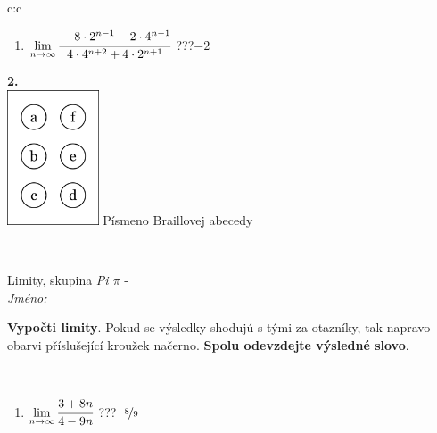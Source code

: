 \documentclass[10pt]{report}
\begin{document}
\begin{tabular}{c:c}
\begin{minipage}[c][104.5mm][t]{0.5\linewidth}
\begin{center}
\begin{minipage}{0.79\linewidth}
\begin{center}
\begin{varwidth}{\linewidth}
\begin{enumerate}
\item $\lim\limits_{n\to\infty}\cfrac{-8\cdot 2^{n-1}-2\cdot 4^{n-1}}{4\cdot 4^{n+2}+4\cdot 2^{n+1}}$\quad \dotfill\; ???\;\dotfill \quad $-2$
\end{enumerate}
\end{varwidth}
\end{center}
\end{minipage}
\begin{minipage}{0.20\linewidth}
\begin{center}
{\Huge\bfseries 2.} \\[2mm]
\includegraphics[height=40mm]{../images/braille.png}
{\small Písmeno Braillovej abecedy}
\end{center}
\end{minipage}
\end{center}
\end{minipage}
\\ \hdashline
\begin{minipage}[c][104.5mm][t]{0.5\linewidth}
\begin{center}
\vspace{7mm}
{\huge Limity, skupina \textit{Pi $\pi$} -}\\[5mm]
\textit{Jméno:}\phantom{xxxxxxxxxxxxxxxxxxxxxxxxxxxxxxxxxxxxxxxxxxxxxxxxxxxxxxxxxxxxxxxxx}\\[5mm]
\begin{minipage}{0.95\linewidth}
\begin{center}
\textbf{Vypočti limity}. Pokud se výsledky shodujú s tými za otazníky, tak napravo\\obarvi příslušející kroužek načerno. \textbf{Spolu odevzdejte výsledné slovo}.
\end{center}
\end{minipage}
\\[1mm]
\begin{minipage}{0.79\linewidth}
\begin{center}
\begin{varwidth}{\linewidth}
\begin{enumerate}
\normalsize
\item $\lim\limits_{n\to\infty}\cfrac{3+8n}{4-9n}$\quad \dotfill\; ???\;\dotfill \quad $\nicefrac{-8}{9}$

\end{enumerate}
\end{varwidth}
\end{center}
\end{minipage}
\end{center}
\end{minipage}
\end{tabular}
\end{document}
